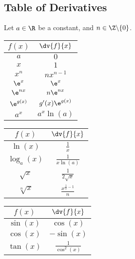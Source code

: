 \documentclass{article}
\renewcommand{\arraystretch}{1.5} %
\begin{document}
\subsection{Table of Derivatives}
Let \(a\in\R\) be a constant, and \(n\in\Z\backslash\{0\}\).
\begin{table}[H]
    \centering
    \renewcommand{\arraystretch}{2.5}
    \begin{tabular}[t]{c c}
        \(f(x)\)      & \(\dv{f}{x}\)      \\[1em]
        \midrule
        \(a\)         & \(0\)              \\
        \(x\)         & \(1\)              \\
        \(x^n\)       & \(n x^{n-1}\)      \\
        \(\e^x\)      & \(\e^x\)           \\
        \(\e^{nx}\)   & \(n\e^{nx}\)       \\
        \(\e^{g(x)}\) & \(g'(x)\e^{g(x)}\) \\
        \(a^x\)       & \(a^x \ln(a)\)     
    \end{tabular}
    \quad
    \begin{tabular}[t]{c c}
        \(f(x)\)                   & \(\dv{f}{x}\)                   \\[1em]
        \midrule
        \(\ln{\left(x\right)}\)    & \(\frac{1}{x}\)                 \\
        \(\log_a{\left(x\right)}\) & \(\frac{1}{x \ln(a)}\)          \\
        \(\sqrt{x}\)               & \(\frac{1}{2 \sqrt{x}}\)        \\[0.5em]
        \(\sqrt[n]{x}\)            & \(\frac{x^{\frac{1}{n}-1}}{n}\)
    \end{tabular}
    \quad
    \begin{tabular}[t]{c c}
        \(f(x)\)                 & \(\dv{f}{x}\)                        \\[1em]
        \midrule
        \(\sin{\left(x\right)}\) & \(\cos{\left(x\right)}\)             \\
        \(\cos{\left(x\right)}\) & \(-\sin{\left(x\right)}\)            \\
        \(\tan{\left(x\right)}\) & \(\frac{1}{\cos^2{\left(x\right)}}\)
    \end{tabular}
\end{table}
\end{document}
